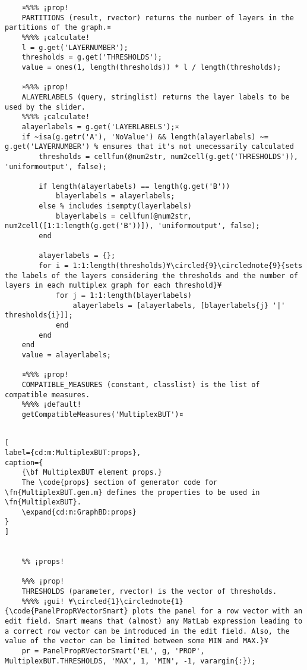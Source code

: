 \documentclass{tufte-handout}
\begin{document}
\begin{lstlisting}
	¤%%% ¡prop!
	PARTITIONS (result, rvector) returns the number of layers in the partitions of the graph.¤
	%%%% ¡calculate!
	l = g.get('LAYERNUMBER');
	thresholds = g.get('THRESHOLDS');
	value = ones(1, length(thresholds)) * l / length(thresholds);
	
	¤%%% ¡prop!
	ALAYERLABELS (query, stringlist) returns the layer labels to be used by the slider.
	%%%% ¡calculate!
	alayerlabels = g.get('LAYERLABELS');¤
	if ~isa(g.getr('A'), 'NoValue') && length(alayerlabels) ~= g.get('LAYERNUMBER') % ensures that it's not unecessarily calculated
		thresholds = cellfun(@num2str, num2cell(g.get('THRESHOLDS')), 'uniformoutput', false);

		if length(alayerlabels) == length(g.get('B'))
			blayerlabels = alayerlabels;
		else % includes isempty(layerlabels)
			blayerlabels = cellfun(@num2str, num2cell([1:1:length(g.get('B'))]), 'uniformoutput', false);
		end
	
		alayerlabels = {};
		for i = 1:1:length(thresholds)¥\circled{9}\circlednote{9}{sets the labels of the layers considering the thresholds and the number of layers in each multiplex graph for each threshold}¥
			for j = 1:1:length(blayerlabels)
				alayerlabels = [alayerlabels, [blayerlabels{j} '|' thresholds{i}]];
			end
		end
	end
	value = alayerlabels;
	
	¤%%% ¡prop! 
	COMPATIBLE_MEASURES (constant, classlist) is the list of compatible measures.
	%%%% ¡default!
	getCompatibleMeasures('MultiplexBUT')¤
	
\end{lstlisting}



\begin{lstlisting}[
label={cd:m:MultiplexBUT:props},
caption={
	{\bf MultiplexBUT element props.}
	The \code{props} section of generator code for \fn{MultiplexBUT.gen.m} defines the properties to be used in \fn{MultiplexBUT}.
	\expand{cd:m:GraphBD:props}
}
]

	
	%% ¡props!
	
	%%% ¡prop!
	THRESHOLDS (parameter, rvector) is the vector of thresholds.
	%%%% ¡gui! ¥\circled{1}\circlednote{1}{\code{PanelPropRVectorSmart} plots the panel for a row vector with an edit field. Smart means that (almost) any MatLab expression leading to a correct row vector can be introduced in the edit field. Also, the value of the vector can be limited between some MIN and MAX.}¥
	pr = PanelPropRVectorSmart('EL', g, 'PROP', MultiplexBUT.THRESHOLDS, 'MAX', 1, 'MIN', -1, varargin{:});
	
	
\end{lstlisting}
\end{document}
